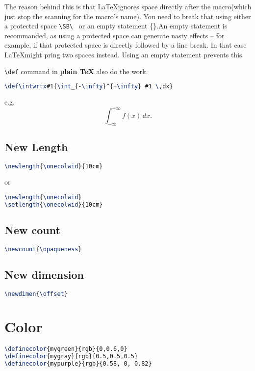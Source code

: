 The reason behind this is that \LaTeX ignores space directly after the
macro(which just stop the scanning for the macro's name). You need to break
that using either a protected space \verb|\SB\ | or an empty statement
\{\}.An empty statement is recommanded, as using a protected space can
generate nasty effects -- for example, if that protected space is directly
followed by a line break. In that case \LaTeX might pring two spaces
instead. Using an empty statement prevents this.

\verb|\def| command in {\bf plain \TeX{}} also do the work.
\begin{lstlisting}[language=TeX]
\def\intwrtx#1{\int_{-\infty}^{+\infty} #1 \,dx}
\end{lstlisting}
\def\intwrtx#1{\int_{-\infty}^{+\infty} #1 \,dx}
e.g.
$$ \intwrtx{f(x)}.$$

\subsection{New Length}
\begin{lstlisting}[language=TeX]
\newlength{\onecolwid}{10cm}
\end{lstlisting}

or 

\begin{lstlisting}[language=TeX]
\newlength{\onecolwid}
\setlength{\onecolwid}{10cm}
\end{lstlisting}
\subsection{New count}
\begin{lstlisting}[language=TeX]
\newcount{\opaqueness}
\end{lstlisting}

\subsection{New dimension}
\begin{lstlisting}[language=TeX]
\newdimen{\offset}
\end{lstlisting}

\section{Color}
\begin{lstlisting}[language=TeX]
\definecolor{mygreen}{rgb}{0,0.6,0}
\definecolor{mygray}{rgb}{0.5,0.5,0.5}
\definecolor{mypurple}{rgb}{0.58, 0, 0.82}
\end{lstlisting}

